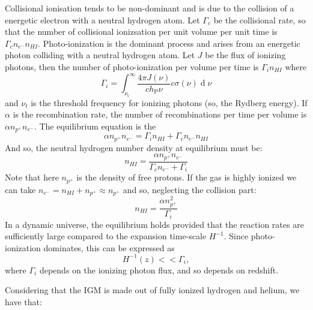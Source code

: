 Collisional ionisation tends to be non-dominant and is due to the collision of a energetic electron with a neutral hydrogen atom. Let $\Gamma_c$ be the collisional rate, so that the number of collisional ionizsation per unit volume per unit time is $\Gamma_c n_{e^-}n_{HI}$. Photo-ionization is the dominant process and arises from an energetic photon colliding with a neutral hydrogen atom. Let $J$ be the flux of ionizing photons, then the number of photo-ionization per volume per time is $\Gamma_i n_{HI}$ where 
\begin{equation}
    \Gamma_i=\int_{\nu_\mathrm{t}}^\infty\frac{4\pi J(\nu)}{ch_\mathrm{P}\nu}c\sigma(\nu)\operatorname{d}\nu
\end{equation}
and $\nu_t$ is the threshold frequency for ionizing photons (so, the Rydberg energy). If $\alpha$ is the recombination rate, the number of recombinations per time per volume is $\alpha n_{p^+}n_{e^-}$.
The equilibrium equation is the
\begin{equation}
    \alpha n_{p^+}n_{e^-}=\Gamma_i n_{HI}+\Gamma_cn_{e^-}n_{HI}  
\end{equation}
And so, the neutral hydrogen number density at equilibrium must be:
\begin{equation}
    n_{HI}=\frac{\alpha n_{p^+}n_{e^-}}{\Gamma_c n_{e^-}+\Gamma_i}
\end{equation}
Note that here $n_{p^+}$ is the density of free protons. If the gas is highly ionized we can take $n_{e^-}=n_{HI}+n_{p^+}\approx n_{p^+}$ and so, neglecting the collision part:
\begin{equation}
    n_{HI}=\frac{\alpha n_{p^+}^2}{\Gamma_i}
\end{equation}
In a dynamic universe, the equilibrium holds provided that the reaction rates are sufficiently large compared to the expansion time-scale $H^{-1}$. Since photo-ionization dominates, this can be expressed as 
\begin{equation}
    H^{-1}(z)<< \Gamma_i,
\end{equation}
where $\Gamma_i$ depends on the ionizing photon flux, and so depends on redshift.
















Considering that the IGM is made out of fully ionized hydrogen and helium, we have that:


